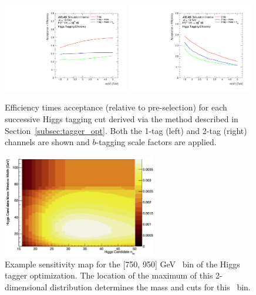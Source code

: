 \begin{figure}[htbp!]
\begin{center}
    \includegraphics[width=0.49\textwidth]{VHqqbb_HiggsTaggingEff_1tag.pdf}
    \includegraphics[width=0.49\textwidth]{VHqqbb_HiggsTaggingEff_2tag.pdf}
\end{center}
\caption{Efficiency times acceptance (relative to pre-selection) for each successive Higgs tagging cut derived via the method described in Section~\ref{subsec:tagger_opt}. Both the 1-tag (left) and 2-tag (right) channels are shown and $b$-tagging scale factors are applied.}
\label{fig:higgs_tagger_eff}
\end{figure}

\begin{figure}[htbp!]
\begin{center}
    \includegraphics[width=0.6\textwidth]{VHqqbb_HiggsOpSens_pT750to900GeV.png}
\end{center}
\caption{Example sensitivity map for the [750, 950] GeV \pt\ bin of the Higgs tagger optimization. The location of the maximum of this 2-dimensional distribution determines the mass and \ntrk cuts for this \pt\ bin.}
\label{fig:higgs_opt_sens}
\end{figure}

